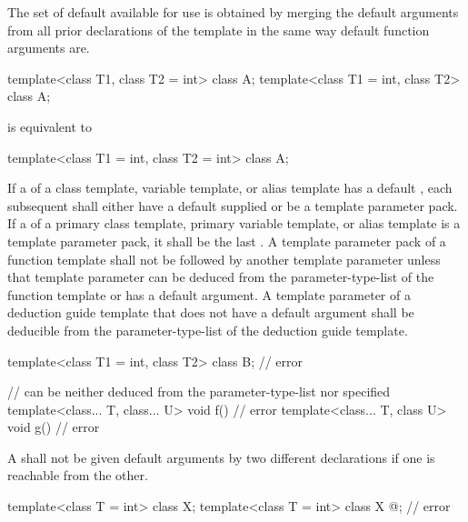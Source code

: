 \pnum
The set of default
available for use is obtained by merging the default arguments
from all prior declarations of the template in the
same way default function arguments are.
\begin{example}
\begin{codeblock}
template<class T1, class T2 = int> class A;
template<class T1 = int, class T2> class A;
\end{codeblock}
is equivalent to
\begin{codeblock}
template<class T1 = int, class T2 = int> class A;
\end{codeblock}
\end{example}

\pnum
If a
of a class template, variable template, or alias template has a default
,
each subsequent
shall either have a default
supplied
or be a template parameter pack. If a 
of a primary class template, primary variable template, or alias template
is a template parameter pack, it shall be the last
.
A template parameter pack of a function template shall not be followed by
another
template parameter unless that template parameter can be deduced from the
parameter-type-list of the function template or has a
default argument.
A template parameter of a deduction guide template
that does not have a default argument
shall be deducible
from the parameter-type-list
of the deduction guide template.
\begin{example}
\begin{codeblock}
template<class T1 = int, class T2> class B;     // error

//  can be neither deduced from the parameter-type-list nor specified
template<class... T, class... U> void f() { }   // error
template<class... T, class U> void g() { }      // error
\end{codeblock}
\end{example}

\pnum
A 
shall not be given default arguments by two different declarations
if one is reachable from the other.
\begin{example}
\begin{codeblock}
template<class T = int> class X;
template<class T = int> class X { @\commentellip@ };  // error
\end{codeblock}
\end{example}

